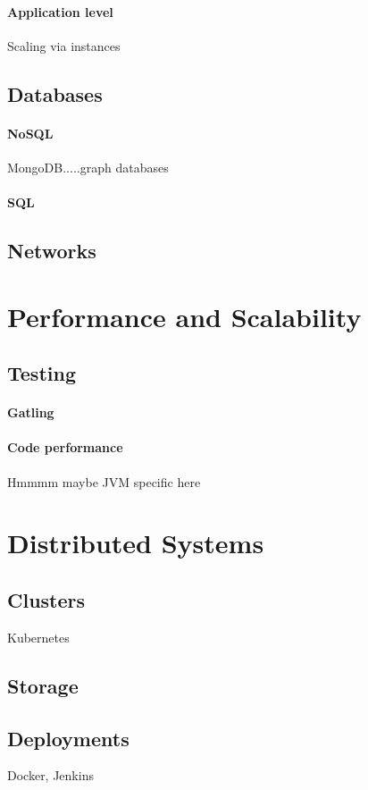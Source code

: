 \documentclass[a4paper, 11pt]{book}
\begin{document}
    \paragraph{Application level}
    Scaling via instances
    \subsection{Databases}
    \paragraph{NoSQL}
    MongoDB.....graph databases
    \paragraph{SQL}
    \subsection{Networks}

    \section{Performance and Scalability}
    \lipsum[6]
    \subsection{Testing}
    \paragraph{Gatling}
    \paragraph{Code performance}
    Hmmmm maybe JVM specific here

    \section{Distributed Systems}
    \subsection{Clusters}
    Kubernetes
    \subsection{Storage}
    \subsection{Deployments}
    Docker, Jenkins
\end{document}
